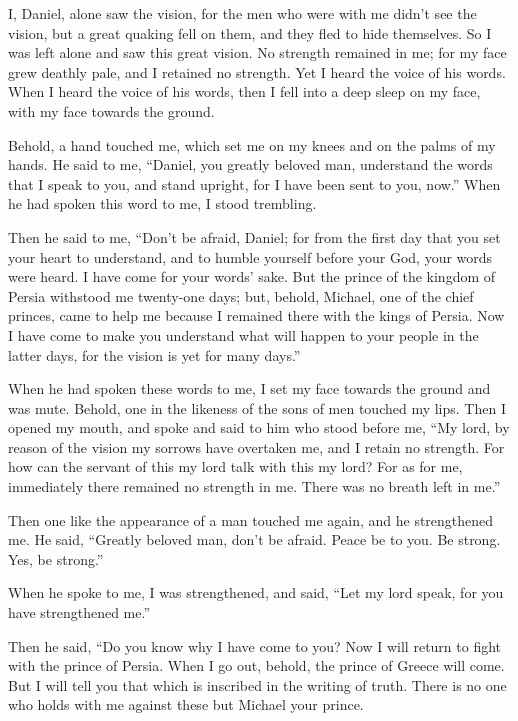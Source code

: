  I, Daniel, alone saw the vision, for the men who were
with me didn't see the vision, but a great quaking fell on them, and
they fled to hide themselves.  So I was left alone and saw
this great vision. No strength remained in me; for my face grew deathly
pale, and I retained no strength.  Yet I heard the voice
of his words. When I heard the voice of his words, then I fell into a
deep sleep on my face, with my face towards the ground.

 Behold, a hand touched me, which set me on my knees and
on the palms of my hands.  He said to me, ``Daniel, you
greatly beloved man, understand the words that I speak to you, and stand
upright, for I have been sent to you, now.'' When he had spoken this
word to me, I stood trembling.

 Then he said to me, ``Don't be afraid, Daniel; for from
the first day that you set your heart to understand, and to humble
yourself before your God, your words were heard. I have come for your
words' sake.  But the prince of the kingdom of Persia
withstood me twenty-one days; but, behold, Michael, one of the chief
princes, came to help me because I remained there with the kings of
Persia.  Now I have come to make you understand what will
happen to your people in the latter days, for the vision is yet for many
days.''

 When he had spoken these words to me, I set my face
towards the ground and was mute.  Behold, one in the
likeness of the sons of men touched my lips. Then I opened my mouth, and
spoke and said to him who stood before me, ``My lord, by reason of the
vision my sorrows have overtaken me, and I retain no strength.
 For how can the servant of this my lord talk with this
my lord? For as for me, immediately there remained no strength in me.
There was no breath left in me.''

 Then one like the appearance of a man touched me again,
and he strengthened me.  He said, ``Greatly beloved man,
don't be afraid. Peace be to you. Be strong. Yes, be strong.''

When he spoke to me, I was strengthened, and said, ``Let my lord speak,
for you have strengthened me.''

 Then he said, ``Do you know why I have come to you? Now
I will return to fight with the prince of Persia. When I go out, behold,
the prince of Greece will come.  But I will tell you that
which is inscribed in the writing of truth. There is no one who holds
with me against these but Michael your prince.

